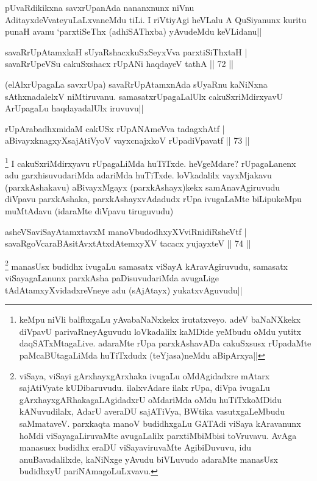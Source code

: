 \begin{artha}
pUvaRdikikxna savxrUpanAda nananxnunx niVnu AditayxdeVvateyuLaLxvaneMdu tiLi. I riVtiyAgi heVLalu A QuSiyanunx kuritu punaH avanu `parxtiSeThx (adhiSAThxba) yAvudeMdu keVLidanu||
\end{artha}

\begin{shl}
savaRrUpAtamxkaH sUyaRshacxkuSxSeyxVva parxtiSiThxtaH |\\
savaRrUpeVSu cakuSxshacx rUpANi haqdayeV tathA \hfill || 72 ||
\end{shl}

\begin{artha}
(elAlxrUpagaLa savxrUpa) savaRrUpAtamxnAda sUyaRnu kaNiNxna sAthxnadalelxV niMtiruvanu. samasatxrUpagaLalUlx cakuSxriMdirxyavU ArUpagaLu haqdayadalUlx iruvuvu||
\end{artha}

\begin{shl}
rUpArabadhxmidaM cakUSx rUpANAmeVva tadagxhAtf |\\
aBivayxknagxyXsajAtiVyoV vayxcnajxkoV rUpadiVpavatf \hfill || 73 ||
\end{shl}

\begin{artha}
\footnote[1]{keMpu niVli balfbxgaLu yAvabaNaNxkekx irutatxveyo. adeV baNaNXkekx diVpavU parivaRneyAguvudu loVkadalilx kaMDide yeMbudu oMdu yutitx daqSATxMtagaLive. adaraMte rUpa parxkAshavADa cakuSxsusx rUpadaMte paMcaBUtagaLiMda huTiTxdudx (teYjasa)neMdu aBipArxya||} I cakuSxriMdirxyavu rUpagaLiMda huTiTxde. heVgeMdare? rUpagaLanenx adu garxhisuvudariMda adariMda huTiTxde. loVkadalilx vayxMjakavu (parxkAshakavu) aBivayxMgayx (parxkAshayx)kekx samAnavAgiruvudu diVpavu parxkAshaka, parxkAshayxvAdadudx rUpa ivugaLaMte biLipukeMpu muMtAdavu (idaraMte diVpavu tiruguvudu)
\end{artha}


\begin{shl}
asheVSaviSayAtamxtavxM manoVbudodhxyXVviRnidiRsheVtf |\\
savaRgoVcaraBAsitAvxtAtxdAtemxyXV tacacx yujayxteV \hfill || 74 ||
\end{shl}

\begin{artha}
\footnote[1]{viSaya, viSayi gArxhayxgArxhaka ivugaLu oMdAgidadxre mAtarx sajAtiVyate kUDibaruvudu. ilalxvAdare ilalx rUpa, diVpa ivugaLu gArxhayxgARhakagaLAgidadxrU oMdariMda oMdu huTiTxkoMDidu kANuvudilalx, AdarU averaDU sajATiVya, BWtika vasutxgaLeMbudu saMmataveV. parxkaqta manoV budidhxgaLu GATAdi viSaya kAravanunx hoMdi viSayagaLiruvaMte avugaLalilx parxtiMbiMbisi toVruvavu. AvAga manasusx budidhx eraDU viSayaviruvaMte AgibiDuvuvu, idu anuBavadalilxde, kaNiNxge yAvudu biVLuvudo adaraMte manasUsx budidhxyU pariNAmagoLuLxvavu.} manasUsx budidhx ivugaLu samasatx viSayA kAravAgiruvudu, samasatx viSayagaLanunx parxkAsha paDisuvudariMda avugaLige tAdAtamxyXvidadxreVneye adu (sAjAtayx) yukatxvAguvudu||
\end{artha}

